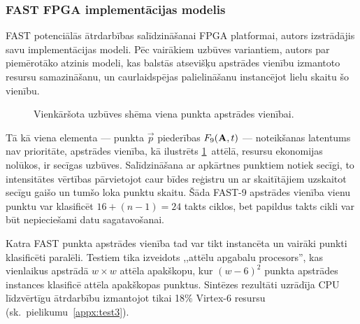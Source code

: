 \subsubsection{FAST FPGA implementācijas modelis} \label{sec:fast-fpga}
FAST potenciālās ātrdarbības salīdzināšanai FPGA platformai, autors
izstrādājis savu implementācijas modeli. Pēc vairākiem uzbūves variantiem,
autors par piemērotāko atzinis modeli, kas balstās atsevišķu apstrādes
vienību izmantoto resursu samazināšanu, un caurlaidspējas palielināšanu
instancējot lielu skaitu šo vienību.

\begin{figure}[tbh]
	\centering
	\def\svgwidth{\linewidth}
	{\small}
	\caption{Vienkāršota uzbūves shēma viena punkta apstrādes vienībai.}
	\label{fig:fast-fpga}
\end{figure}

Tā kā viena elementa --- punkta $\vec{p}$ piederības $F_9(\mathbf{A},t)$ ---
noteikšanas latentums nav prioritāte, apstrādes vienība, kā ilustrēts
\ref{fig:fast-fpga}~attēlā, resursu ekonomijas nolūkos, ir secīgas uzbūves.
Salīdzināšana ar apkārtnes punktiem notiek secīgi, to intensitātes vērtības
pārvietojot caur bīdes reģistru un ar skaitītājiem uzskaitot secīgu
gaišo un tumšo loka punktu skaitu. Šāda FAST-9 apstrādes vienība vienu punktu
var klasificēt $16+(n-1)=24$ takts ciklos, bet papildus takts cikli
var būt nepieciešami datu sagatavošanai.

Katra FAST punkta apstrādes vienība tad var tikt instancēta un vairāki
punkti klasificēti paralēli. Testiem tika izveidots
,,attēlu apgabalu procesors'', kas vienlaikus apstrādā $w \times w$ attēla
apakškopu, kur ${(w-6)}^2$ punkta apstrādes instances klasificē attēla
apakškopas punktus. Sintēzes rezultāti uzrādīja CPU līdzvērtīgu ātrdarbību
izmantojot tikai 18\% Virtex-6 resursu
(sk.~pielikumu~\ref{appx:test3}).

\TODO
